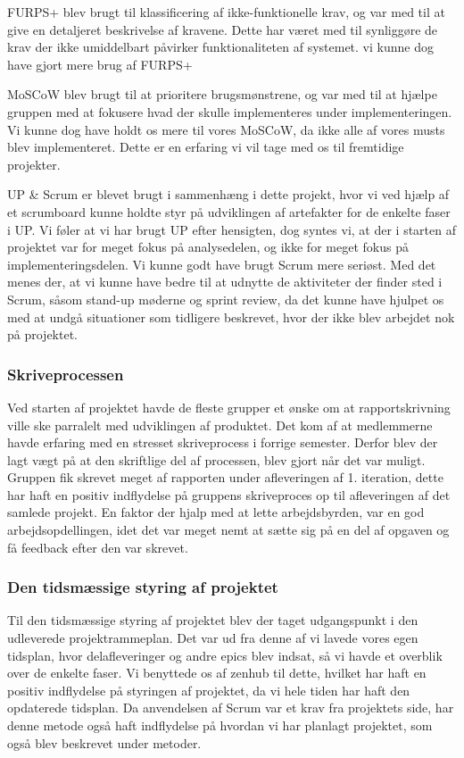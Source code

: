 FURPS+ blev brugt til klassificering af ikke-funktionelle krav, og var med til at give en detaljeret beskrivelse af kravene. Dette har været med til synliggøre de krav der ikke umiddelbart påvirker funktionaliteten af systemet. vi kunne dog have gjort mere brug af FURPS+

MoSCoW blev brugt til at prioritere brugsmønstrene, og var med til at hjælpe gruppen med at fokusere hvad der skulle implementeres under implementeringen. Vi kunne dog have holdt os mere til vores MoSCoW, da ikke alle af vores musts blev implementeret. Dette er en erfaring vi vil tage med os til fremtidige projekter.

UP \& Scrum er blevet brugt i sammenhæng i dette projekt, hvor vi ved hjælp af et scrumboard kunne holdte styr på udviklingen af artefakter for de enkelte faser i UP. Vi føler at vi har brugt UP efter hensigten, dog syntes vi, at der i starten af projektet var for meget fokus på analysedelen, og ikke for meget fokus på implementeringsdelen. Vi kunne godt have brugt Scrum mere seriøst. Med det menes der, at vi kunne have bedre til at udnytte de aktiviteter der finder sted i Scrum, såsom stand-up møderne og sprint review, da det kunne have hjulpet os med at undgå situationer som tidligere beskrevet, hvor der ikke blev arbejdet nok på projektet.

\subsubsection{Skriveprocessen}
Ved starten af projektet havde de fleste grupper et ønske om at rapportskrivning ville ske parralelt med udviklingen af produktet. Det kom af at medlemmerne havde erfaring med en stresset skriveprocess i forrige semester. Derfor blev der lagt vægt på at den skriftlige del af processen, blev gjort når det var muligt. Gruppen fik skrevet meget af rapporten under afleveringen af 1. iteration, dette har haft en positiv indflydelse på gruppens skriveproces op til afleveringen af det samlede projekt. En faktor der hjalp med at lette arbejdsbyrden, var en god arbejdsopdellingen, idet det var meget nemt at sætte sig på en del af opgaven og få feedback efter den var skrevet.

\subsubsection{Den tidsmæssige styring af projektet}
Til den tidsmæssige styring af projektet blev der taget udgangspunkt i den udleverede projektrammeplan. Det var ud fra denne af vi lavede vores egen tidsplan, hvor delafleveringer og andre epics blev indsat, så vi havde et overblik over de enkelte faser. Vi benyttede os af zenhub til dette, hvilket har haft en positiv indflydelse på styringen af projektet, da vi hele tiden har haft den opdaterede tidsplan. Da anvendelsen af Scrum var et krav fra projektets side, har denne metode også haft indflydelse på hvordan vi har planlagt projektet, som også blev beskrevet under metoder.

